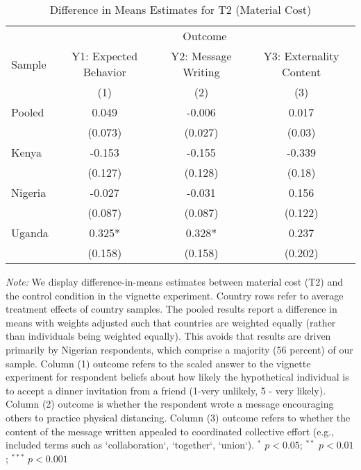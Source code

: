 \begin{table}[htb]
\centering
\caption{Difference in Means Estimates for T2 (Material Cost)} 
\label{tab_dim_mat}
\begin{tabular}{lccc}
\hline\hline & \multicolumn{3}{c}{Outcome} \\
Sample & Y1: Expected Behavior & Y2: Message Writing & Y3: Externality Content \\ 
& (1) & (2) & (3) \\ \hline
Pooled & 0.049 & -0.006 & 0.017 \\ 
   & (0.073) & (0.027) & (0.03) \\ 
  Kenya & -0.153 & -0.155 & -0.339 \\ 
   & (0.127) & (0.128) & (0.18) \\ 
  Nigeria & -0.027 & -0.031 & 0.156 \\ 
   & (0.087) & (0.087) & (0.122) \\ 
  Uganda & 0.325* & 0.328* & 0.237 \\ 
   & (0.158) & (0.158) & (0.202) \\ 
   \hline
\end{tabular}
\begin{flushleft}\textit{Note:} We display difference-in-means estimates between material cost (T2) and the control condition in the vignette experiment. Country rows refer to average treatment effects of country samples. The pooled results report a difference in means with weights adjusted such that countries are weighted equally (rather than individuals being weighted equally). This avoids that results are driven primarily by Nigerian respondents, which comprise a majority (56 percent) of our sample. Column (1) outcome refers to the scaled answer to the vignette experiment for respondent beliefs about how likely the hypothetical individual is to accept a dinner invitation from a friend (1-very unlikely, 5 - very likely). Column (2) outcome is whether the respondent wrote a message encouraging others to practice physical distancing.  Column (3) outcome refers to whether the content of the message written appealed to coordinated collective effort (e.g., included terms such as `collaboration`, `together`, `union`). $^{*}$ $p<0.05$; $^{**}$ $p<0.01$; $^{***}$ $p<0.001$  \end{flushleft}
\end{table}
